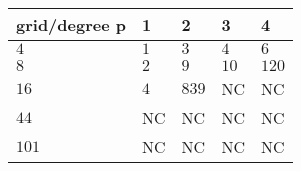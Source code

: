 \begin{tabular}{lllll}
\hline
 grid/degree p   & 1   & 2     & 3    & 4     \\
\hline
 $4$             & $1$ & $3$   & $4$  & $6$   \\
 $8$             & $2$ & $9$   & $10$ & $120$ \\
 $16$            & $4$ & $839$ & NC   & NC    \\
 $44$            & NC  & NC    & NC   & NC    \\
 $101$           & NC  & NC    & NC   & NC    \\
\hline
\end{tabular}